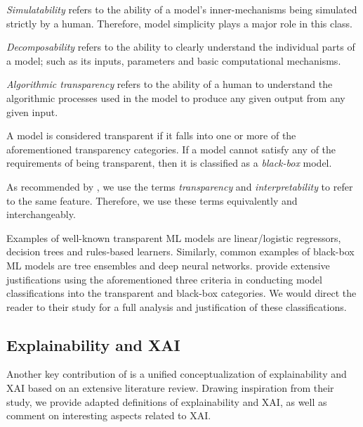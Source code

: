 \begin{remark}
  \textit{Simulatability} refers to the ability of a model's inner-mechanisms
  being simulated strictly by a human. Therefore, model simplicity plays a major
  role in this class.
\end{remark}

\begin{remark}
  \textit{Decomposability} refers to the ability to clearly understand the
  individual parts of a model; such as its inputs, parameters and basic
  computational mechanisms.
\end{remark}

\begin{remark}
  \textit{Algorithmic transparency} refers to the ability of a human to
  understand the algorithmic processes used in the model to produce any given
  output from any given input.
\end{remark}

\begin{remark}
  A model is considered transparent if it falls into one or more of the
  aforementioned transparency categories. If a model cannot satisfy any of the
  requirements of being transparent, then it is classified as a
  \textit{black-box} model.
\end{remark}

\begin{remark}
  \label{rmk:equivalence}
  As recommended by \citet[Page 3, Section 2.1]{arrieta2020explainable}, we use
  the terms \textit{transparency} and \textit{interpretability} to refer to the same feature.
  Therefore, we use these terms equivalently and interchangeably.
\end{remark}

Examples of well-known transparent ML models are linear/logistic regressors,
decision trees and rules-based learners. Similarly, common examples of black-box
ML models are tree ensembles and deep neural networks.
\citet{arrieta2020explainable} provide extensive justifications using the
aforementioned three criteria in conducting model classifications into the
transparent and black-box categories. We would direct the reader to their study
for a full analysis and justification of these classifications.

\subsection{Explainability and XAI}

Another key contribution of \citet{arrieta2020explainable} is a unified
conceptualization of explainability and XAI based on an extensive literature
review. Drawing inspiration from their study, we provide adapted definitions of
explainability and XAI, as well as comment on interesting aspects related to
XAI.

